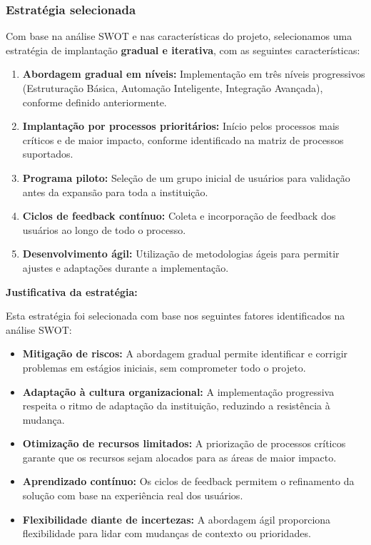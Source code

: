 \documentclass[12pt,a4paper]{article}
\begin{document}
\subsubsection{Estratégia selecionada}

Com base na análise SWOT e nas características do projeto, selecionamos uma estratégia de implantação \textbf{gradual e iterativa}, com as seguintes características:

\begin{enumerate}
    \item \textbf{Abordagem gradual em níveis:} Implementação em três níveis progressivos (Estruturação Básica, Automação Inteligente, Integração Avançada), conforme definido anteriormente.
    
    \item \textbf{Implantação por processos prioritários:} Início pelos processos mais críticos e de maior impacto, conforme identificado na matriz de processos suportados.
    
    \item \textbf{Programa piloto:} Seleção de um grupo inicial de usuários para validação antes da expansão para toda a instituição.
    
    \item \textbf{Ciclos de feedback contínuo:} Coleta e incorporação de feedback dos usuários ao longo de todo o processo.
    
    \item \textbf{Desenvolvimento ágil:} Utilização de metodologias ágeis para permitir ajustes e adaptações durante a implementação.
\end{enumerate}

\textbf{Justificativa da estratégia:}

Esta estratégia foi selecionada com base nos seguintes fatores identificados na análise SWOT:

\begin{itemize}
    \item \textbf{Mitigação de riscos:} A abordagem gradual permite identificar e corrigir problemas em estágios iniciais, sem comprometer todo o projeto.
    
    \item \textbf{Adaptação à cultura organizacional:} A implementação progressiva respeita o ritmo de adaptação da instituição, reduzindo a resistência à mudança.
    
    \item \textbf{Otimização de recursos limitados:} A priorização de processos críticos garante que os recursos sejam alocados para as áreas de maior impacto.
    
    \item \textbf{Aprendizado contínuo:} Os ciclos de feedback permitem o refinamento da solução com base na experiência real dos usuários.
    
    \item \textbf{Flexibilidade diante de incertezas:} A abordagem ágil proporciona flexibilidade para lidar com mudanças de contexto ou prioridades.
\end{itemize}
\end{document}
